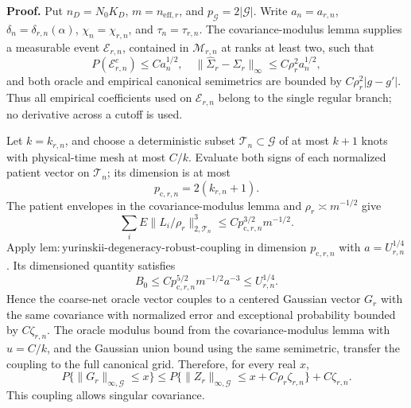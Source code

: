 \textbf{Proof.}
Put \(n_D=N_0K_D\), \(m=n_{\mathrm{eff},r}\), and \(p_{\mathcal G}=2|\mathcal G|\).  Write \(a_n=a_{r,n}\), \(\delta_n=\delta_{r,n}(\alpha)\), \(\chi_n=\chi_{r,n}\), and \(\tau_n=\tau_{r,n}\).  The covariance-modulus lemma supplies a measurable event \(\mathcal E_{r,n}\), contained in \(\mathcal M_{r,n}\) at ranks at least two, such that
\[
 P(\mathcal E_{r,n}^c)\le Ca_n^{1/2},
 \quad
 \|\widehat\Sigma_r-\Sigma_r\|_\infty
 \le C\rho_r^2a_n^{1/2},                                \tag{1}
\]
and both oracle and empirical canonical semimetrics are bounded by
\(C\rho_r^2|g-g'|\).  Thus all empirical coefficients used on \(\mathcal E_{r,n}\) belong to the single regular branch; no derivative across a cutoff is used.

Let \(k=k_{r,n}\), and choose a deterministic subset \(\mathcal T_n\subset\mathcal G\) of at most \(k+1\) knots with physical-time mesh at most \(C/k\).  Evaluate both signs of each normalized patient vector on \(\mathcal T_n\); its dimension is at most
\[
 p_{\mathrm c,r,n}=2(k_{r,n}+1).                        \tag{2}
\]
The patient envelopes in the covariance-modulus lemma and \(\rho_r\asymp m^{-1/2}\) give
\[
 \sum_iE\|L_i/\rho_r\|_{2,\mathcal T_n}^3
 \le Cp_{\mathrm c,r,n}^{3/2}m^{-1/2}.                 \tag{3}
\]
Apply \(\mathrm{lem:yurinskii\mbox{-}degeneracy\mbox{-}robust\mbox{-}coupling}\) in dimension \(p_{\mathrm c,r,n}\) with \(a=U_{r,n}^{1/4}\).  Its dimensioned quantity satisfies
\[
 B_0\le Cp_{\mathrm c,r,n}^{5/2}m^{-1/2}a^{-3}
 \le U_{r,n}^{1/4}.                                     \tag{4}
\]
Hence the coarse-net oracle vector couples to a centered Gaussian vector \(G_r\) with the same covariance with normalized error and exceptional probability bounded by \(C\zeta_{r,n}\).  The oracle modulus bound from the covariance-modulus lemma with \(u=C/k\), and the Gaussian union bound using the same semimetric, transfer the coupling to the full canonical grid.  Therefore, for every real \(x\),
\[
 P\{\|G_r\|_{\infty,\mathcal G}\le x\}
 \le P\{\|Z_r\|_{\infty,\mathcal G}
 \le x+C\rho_r\zeta_{r,n}\}+C\zeta_{r,n}.             \tag{5}
\]
This coupling allows singular covariance.

